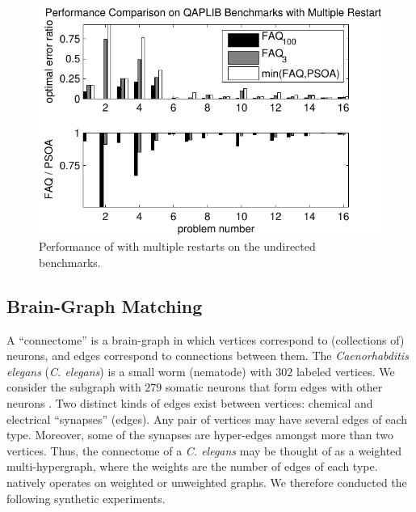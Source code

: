 \documentclass[10pt,journal,cspaper,compsoc]{IEEEtran}
\begin{document}
\begin{figure}[htbp]
	\centering
		\includegraphics[width=1.0\linewidth]{../figs/path16_restarts.pdf}
	\caption{Performance of \FAQ with multiple restarts on the undirected benchmarks.}
	\label{fig:restarts}
\end{figure}



% 



\subsection{Brain-Graph Matching} %
\label{sub:connectome_classification}

A ``connectome'' is a brain-graph in which vertices correspond to (collections of) neurons, and edges correspond to connections between them. The \emph{Caenorhabditis elegans} (\emph{C. elegans}) is a small worm (nematode) with $302$ labeled vertices.  We consider the subgraph with $279$ somatic neurons that form edges with other neurons \cite{WhiteBrenner86, Varshney2011}.  Two distinct kinds of edges exist between vertices: chemical and electrical ``synapses'' (edges). Any pair of vertices may have several edges of each type. Moreover, some of the synapses are hyper-edges amongst more than two vertices.   Thus, the connectome of a \emph{C. elegans} may be thought of as a weighted multi-hypergraph, where the weights are the number of edges of each type.  \FAQ natively operates on weighted or unweighted graphs.  We therefore conducted the following synthetic experiments.  
\end{document}
